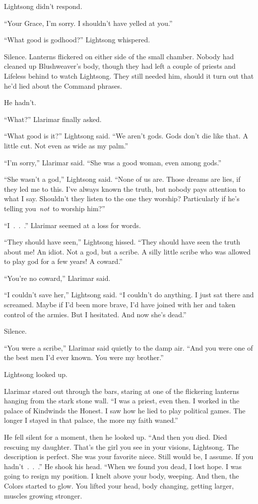 Lightsong didn’t respond.

“Your Grace, I’m sorry. I shouldn’t have yelled at you.”

“What good is godhood?” Lightsong whispered.

Silence. Lanterns flickered on either side of the small chamber. Nobody had cleaned up Blushweaver’s body, though they had left a couple of priests and Lifeless behind to watch Lightsong. They still needed him, should it turn out that he’d lied about the Command phrases.

He hadn’t.

“What?” Llarimar finally asked.

“What good is it?” Lightsong said. “We aren’t gods. Gods don’t die like that. A little cut. Not even as wide as my palm.”

“I’m sorry,” Llarimar said. “She was a good woman, even among gods.”

“She wasn’t a god,” Lightsong said. “None of us are. Those dreams are lies, if they led me to this. I’ve always known the truth, but nobody pays attention to what I say. Shouldn’t they listen to the one they worship? Particularly if he’s telling you~\textit{not}~to worship him?”

“I~.~.~.” Llarimar seemed at a loss for words.

“They should have seen,” Lightsong hissed. “They should have seen the truth about me! An idiot. Not a god, but a scribe. A silly little scribe who was allowed to play god for a few years! A coward.”

“You’re no coward,” Llarimar said.

“I couldn’t save her,” Lightsong said. “I couldn’t do anything. I just sat there and screamed. Maybe if I’d been more brave, I’d have joined with her and taken control of the armies. But I hesitated. And now she’s dead.”

Silence.

“You were a scribe,” Llarimar said quietly to the damp air. “And you were one of the best men I’d ever known. You were my brother.”

Lightsong looked up.

Llarimar stared out through the bars, staring at one of the flickering lanterns hanging from the stark stone wall. “I was a priest, even then. I worked in the palace of Kindwinds the Honest. I saw how he lied to play political games. The longer I stayed in that palace, the more my faith waned.”

He fell silent for a moment, then he looked up. “And then you died. Died rescuing my daughter. That’s the girl you see in your visions, Lightsong. The description is perfect. She was your favorite niece. Still would be, I assume. If you hadn’t~.~.~.” He shook his head. “When we found you dead, I lost hope. I was going to resign my position. I knelt above your body, weeping. And then, the Colors started to glow. You lifted your head, body changing, getting larger, muscles growing stronger.

